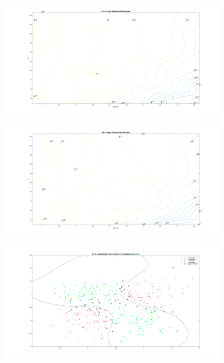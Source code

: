 \documentclass[11pt,a4paper]{article}
\begin{document}
\begin{figure}[h]
	\includegraphics[angle=270,width=\textwidth]{94b_1.png}
	\centering
\end{figure}
\begin{figure}[h]
	\includegraphics[angle=270,width=\textwidth]{94b_2.png}
	\centering
\end{figure}
\begin{figure}[h]
	\includegraphics[angle=270,width=\linewidth]{94d.png}
	\centering
\end{figure}
\end{document}
